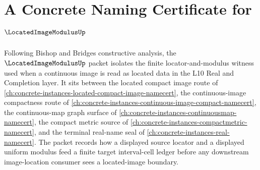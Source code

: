 \chapter{A Concrete Naming Certificate for $\LocatedImageModulusUp$}
\label{ch:concrete-instances-located-image-modulus-namecert}

Following Bishop and Bridges constructive analysis, the $\LocatedImageModulusUp$ packet isolates the finite locator-and-modulus witness used when a continuous image is read as located data in the L10 Real and Completion layer. It sits between the located compact image route of \autoref{ch:concrete-instances-located-compact-image-namecert}, the continuous-image compactness route of \autoref{ch:concrete-instances-continuous-image-compact-namecert}, the continuous-map graph surface of \autoref{ch:concrete-instances-continuousmap-namecert}, the compact metric source of \autoref{ch:concrete-instances-compactmetric-namecert}, and the terminal real-name seal of \autoref{ch:concrete-instances-real-namecert}. The packet records how a displayed source locator and a displayed uniform modulus feed a finite target interval-cell ledger before any downstream image-location consumer sees a located-image boundary.

